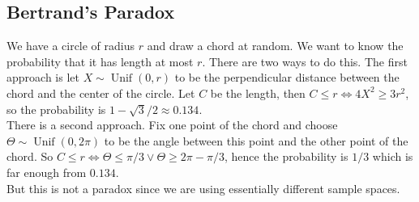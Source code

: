 \subsection{Bertrand's Paradox}
We have a circle of radius $r$ and draw a chord at random.
We want to know the probability that it has length at most $r$.
There are two ways to do this.
The first approach is let $X\sim\operatorname{Unif}(0,r)$ to be the perpendicular distance between the chord and the center of the circle.
Let $C$ be the length, then $C\le r\iff 4X^2\ge 3r^2$, so the probability is $1-\sqrt{3}/2\approx 0.134$.\\
There is a second approach.
Fix one point of the chord and choose $\Theta\sim\operatorname{Unif}(0,2\pi)$ to be the angle between this point and the other point of the chord.
So $C\le r\iff \Theta\le\pi/3\lor\Theta\ge 2\pi-\pi/3$, hence the probability is $1/3$ which is far enough from $0.134$.\\
But this is not a paradox since we are using essentially different sample spaces.